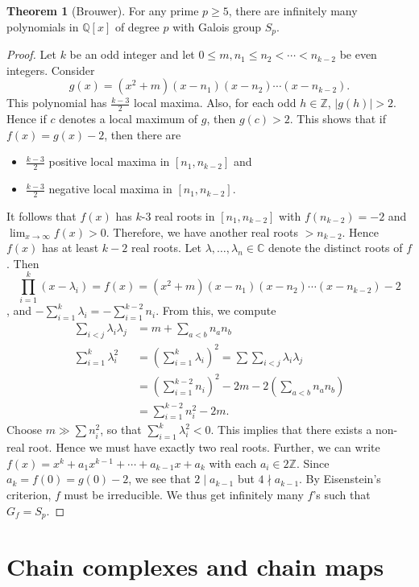 \documentclass[10pt,letterpaper,cm]{nupset}
\theoremstyle{definition}
\theoremstyle{theorem}
\newtheorem{theorem}[definition]{Theorem}
\theoremstyle{remark}
\newcommand{\C}{\mathbb C}
\newcommand{\Q}{\mathbb Q}
\newcommand{\Z}{\mathbb Z}
\newcommand{\1}{\mathbf{1}}
\newcommand{\0}{\vec 0}
\begin{document}
\begin{theorem}[Brouwer]
For any prime $p \geq 5$, there are infinitely many polynomials in $\Q[x]$ of degree $p$ with Galois group $S_p$.
\end{theorem}
\begin{proof}
Let $k$ be an odd integer and let $0\leq m, n_1 \leq n_2 < \cdots < n_{k-2}$ be even integers. Consider $$g(x) = (x^2 +m)(x-n_1)(x-n_2) \cdots (x-n_{k-2}).$$ This polynomial has $\frac{k-3}{2}$ local maxima. Also, for each odd $h\in \Z$, $|g(h)| >2$. Hence if $c$ denotes a local maximum of $g$, then $g(c) >2$. This shows that if $f(x) = g(x) -2$, then there are 
\begin{itemize}
\item $\frac{k-3}{2}$ positive local maxima in $[n_1, n_{k-2}]$ and
\item $\frac{k-3}{2}$ negative local maxima in $[n_1, n_{k-2}]$.
\end{itemize}
It follows that $f(x)$ has $k$-3 real roots in $[n_1, n_{k-2}]$ with $f(n_{k-2}) = {-}2$ and $\lim_{x\to \infty} f(x) >0$. Therefore, we have another real roots $> n_{k-2}$. Hence $f(x)$ has at least $k-2$ real roots. Let $\lambda, \ldots, \lambda_n \in \C$ denote the distinct roots of $f$. Then $$\prod_{i=1}^k(x-\lambda_i) = f(x) = (x^2 +m)(x-n_1)(x-n_2) \cdots (x-n_{k-2}) -2$$, and ${-}\sum_{i=1}^k \lambda_i = {-} \sum_{i=1}^{k-2} n_i$. From this, we compute
\begin{align*}
\sum_{i <j} \lambda_i \lambda_j & = m + \sum_{a < b} n_an_b 
\\ \sum_{i=1}^k \lambda_i^2 & = \left(\sum_{i=1}^k \lambda_i \right)^2 = \sum \sum_{i<j} \lambda _i \lambda_j
\\ & = \left( \sum_{i=1}^{k-2} n_i \right)^2 -2m - 2 \left( \sum_{a<b} n_an_b \right)
\\ & = \sum_{i=1}^{k-2} n_i^2 - 2m.
\end{align*}
Choose $m \gg \sum n_i^2$, so that $\sum_{i=1}^k \lambda_i^2  < 0$. This implies that there exists a non-real root. Hence we must have exactly two real roots. Further,  we can write $f(x) = x^k + a_1x^{k-1} + \cdots +a_{k-1} x +a_k$ with each $a_i \in 2\Z$. Since $a_k = f(0) = g(0) -2$, we see that $2 \mid a_{k-1}$ but $4 \nmid a_{k-1}$. By Eisenstein's criterion, $f$ must be irreducible. We thus get infinitely many $f$'s such that $G_f = S_p$. 
\end{proof}

\section{Chain complexes and chain maps}
\end{document}
